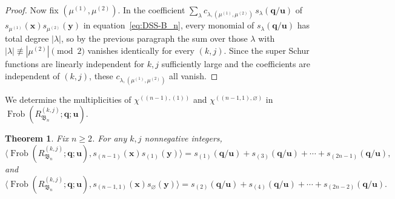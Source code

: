 \documentclass[12pt]{amsart}
\theoremstyle{plain}
\newtheorem{theorem}{Theorem}[section]
\theoremstyle{definition}
\DeclareMathOperator{\Frob}{Frob}
\newcommand{\x}{\mathbf{x}}
\newcommand{\y}{\mathbf{y}}
\begin{document}
\begin{proof}
Now fix $(\mu^{(1)},\mu^{(2)})$. In the coefficient $\sum_{\lambda} c_{\lambda,(\mu^{(1)},\mu^{(2)})}\, s_\lambda(\mathbf{q}/\mathbf{u})$ of $s_{\mu^{(1)}}(\x) s_{\mu^{(2)}}(\y)$ in equation~\eqref{eq:DSS-B_n}, every monomial of $s_\lambda(\mathbf{q}/\mathbf{u})$ has total degree $|\lambda|$, so by the previous paragraph the sum over those $\lambda$ with $|\lambda| \not\equiv |\mu^{(2)}| \pmod{2}$ vanishes identically for every $(k,j)$. 
Since the super Schur functions are linearly independent for $k, j$ sufficiently large \cite[Lemma 6.4]{BereleRegev} and the coefficients are independent of $(k,j)$, these $c_{\lambda,(\mu^{(1)},\mu^{(2)})}$ all vanish.
\end{proof}

We determine the multiplicities of $\chi^{((n-1),(1))}$ and $\chi^{((n-1,1),\varnothing)}$ in $\Frob(R_{\mathfrak{B}_n}^{(k,j)}; \mathbf{q};\mathbf{u})$.

\begin{theorem}\label{thm:standard-character-B_n} Fix $n \geq 2$. For any
$k,j$ nonnegative integers,
    \begin{equation}
        \langle \Frob(R_{\mathfrak{B}_n}^{(k,j)}; \mathbf{q};\mathbf{u}),
        s_{(n-1)}(\x)s_{(1)}(\y) \rangle
        = s_{(1)}(\mathbf{q}/\mathbf{u}) + s_{(3)}(\mathbf{q}/\mathbf{u})
        + \cdots + s_{(2n-1)}(\mathbf{q}/\mathbf{u}),
    \end{equation}
    and
        \begin{equation}
        \langle \Frob(R_{\mathfrak{B}_n}^{(k,j)}; \mathbf{q};\mathbf{u}),
        s_{(n-1,1)}(\x)s_{\varnothing}(\y) \rangle
        = s_{(2)}(\mathbf{q}/\mathbf{u}) + s_{(4)}(\mathbf{q}/\mathbf{u})
        + \cdots + s_{(2n-2)}(\mathbf{q}/\mathbf{u}).
    \end{equation}
\end{theorem}
\end{document}
